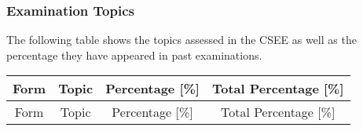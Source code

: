 \subsubsection{Examination Topics}
\noindent The following table shows the topics assessed in the CSEE as well as the percentage they have appeared in past examinations. 
\begin{center}
	\begin{longtable}{|c|l|c|c|} 
	
		\hline Form & \multicolumn{1}{|c|}{Topic} & Percentage [\%] & Total Percentage [\%] \\ \hline
		\endfirsthead
		
		\hline Form & \multicolumn{1}{|c|}{Topic} & Percentage [\%] & Total Percentage [\%] \\ \hline
		\endhead
		

\end{longtable}
\end{center}
